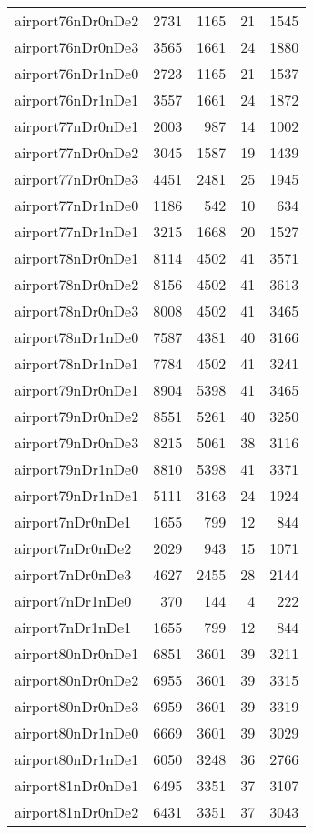 \documentclass[../../../thesis.tex]{subfiles}
\begin{document}
\begin{longtable}{lrrrr}
airport76nDr0nDe2 & 2731 & 1165 & 21 & 1545 \\
airport76nDr0nDe3 & 3565 & 1661 & 24 & 1880 \\
airport76nDr1nDe0 & 2723 & 1165 & 21 & 1537 \\
airport76nDr1nDe1 & 3557 & 1661 & 24 & 1872 \\
airport77nDr0nDe1 & 2003 & 987 & 14 & 1002 \\
airport77nDr0nDe2 & 3045 & 1587 & 19 & 1439 \\
airport77nDr0nDe3 & 4451 & 2481 & 25 & 1945 \\
airport77nDr1nDe0 & 1186 & 542 & 10 & 634 \\
airport77nDr1nDe1 & 3215 & 1668 & 20 & 1527 \\
airport78nDr0nDe1 & 8114 & 4502 & 41 & 3571 \\
airport78nDr0nDe2 & 8156 & 4502 & 41 & 3613 \\
airport78nDr0nDe3 & 8008 & 4502 & 41 & 3465 \\
airport78nDr1nDe0 & 7587 & 4381 & 40 & 3166 \\
airport78nDr1nDe1 & 7784 & 4502 & 41 & 3241 \\
airport79nDr0nDe1 & 8904 & 5398 & 41 & 3465 \\
airport79nDr0nDe2 & 8551 & 5261 & 40 & 3250 \\
airport79nDr0nDe3 & 8215 & 5061 & 38 & 3116 \\
airport79nDr1nDe0 & 8810 & 5398 & 41 & 3371 \\
airport79nDr1nDe1 & 5111 & 3163 & 24 & 1924 \\
airport7nDr0nDe1 & 1655 & 799 & 12 & 844 \\
airport7nDr0nDe2 & 2029 & 943 & 15 & 1071 \\
airport7nDr0nDe3 & 4627 & 2455 & 28 & 2144 \\
airport7nDr1nDe0 & 370 & 144 & 4 & 222 \\
airport7nDr1nDe1 & 1655 & 799 & 12 & 844 \\
airport80nDr0nDe1 & 6851 & 3601 & 39 & 3211 \\
airport80nDr0nDe2 & 6955 & 3601 & 39 & 3315 \\
airport80nDr0nDe3 & 6959 & 3601 & 39 & 3319 \\
airport80nDr1nDe0 & 6669 & 3601 & 39 & 3029 \\
airport80nDr1nDe1 & 6050 & 3248 & 36 & 2766 \\
airport81nDr0nDe1 & 6495 & 3351 & 37 & 3107 \\
airport81nDr0nDe2 & 6431 & 3351 & 37 & 3043 \\

\end{longtable}
\end{document}
